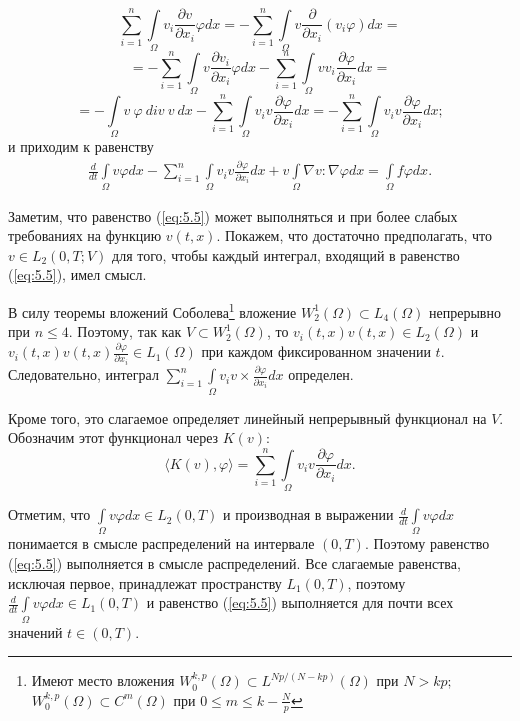 $$\sum_{i=1}^{n}\int\limits_\Omega v_i\frac{\partial v}{\partial x_i}\varphi dx=-\sum_{i=1}^{n}\int\limits_\Omega v\frac{\partial}{\partial x_i}(v_i\varphi)dx=$$
$$=-\sum_{i=1}^{n}\int\limits_\Omega v\frac{\partial v_i}{\partial x_i}\varphi dx-\sum_{i=1}^{n}\int\limits_\Omega vv_i\frac{\partial\varphi}{\partial x_i} dx=$$
$$=-\int\limits_\Omega v \ \varphi \ div \ v \ dx-\sum_{i=1}^{n}\int\limits_\Omega v_i v\frac{\partial\varphi}{\partial x_i}dx=
-\sum_{i=1}^{n}\int\limits_\Omega v_i v\frac{\partial\varphi}{\partial x_i}dx;$$
и приходим к равенству
\begin{equation}\label{eq:5.5}
    \begin{gathered}
        \frac{d}{dt}\int\limits_\Omega v \varphi dx-\sum_{i=1}^{n}\int\limits_\Omega v_i v
        \frac{\partial \varphi }{\partial x_i}dx + v\int\limits_\Omega \nabla v :\nabla\varphi dx
        =\int\limits_\Omega f\varphi dx.
    \end{gathered}
\end{equation}

Заметим, что равенство (\ref{eq:5.5}) может выполняться и при более слабых требованиях на функцию $v(t, x)$.
Покажем, что достаточно предполагать, что $v\in L_2(0, T;V)$ для того, чтобы каждый интеграл, входящий в равенство (\ref{eq:5.5}), имел смысл.

В силу теоремы вложений Соболева\footnote{Имеют место вложения $W^{k,p}_0(\Omega)\subset L^{Np/(N-kp)}(\Omega)$ при $N>kp;$\\
$W^{k,p}_0(\Omega)\subset C^{m}(\Omega)$ при $0\le m\le k-\frac{N}{p}$} вложение $W^{1}_{2}(\Omega)\subset L_4(\Omega)$ непрерывно при $n \leqslant 4$.
Поэтому, так как $V\subset W^{1}_{2}(\Omega)$, то $v_i(t, x)v(t, x)\in L_2(\Omega)$ и $v_i(t, x)v(t, x)\frac{\partial \varphi }{\partial x_i} \in L_1(\Omega)$
при каждом фиксированном значении $t$. Следовательно, интеграл $\sum\limits_{i=1}^{n}\int\limits_\Omega v_iv\times\frac{\partial\varphi}{\partial x_i}dx$ определен.

Кроме того, это слагаемое определяет линейный непрерывный функционал на $V$. Обозначим этот функционал через $K(v)$:
$$\langle K(v),\varphi \rangle = \sum_{i=1}^{n}\int\limits_\Omega v_i v \frac{\partial \varphi}{\partial x_i}dx.$$

Отметим, что $\int\limits_\Omega v \varphi dx\in L_2(0, T)$ и производная в выражении \linebreak
$\frac{d}{dt}\int\limits_\Omega v \varphi dx$
понимается в смысле распределений на интервале $(0, T)$. Поэтому равенство (\ref{eq:5.5}) выполняется в смысле распределений.
Все слагаемые равенства, исключая первое, принадлежат пространству $L_1(0, T)$, поэтому $\frac{d}{dt}\int\limits_\Omega v \varphi dx\in L_1(0, T)$
и равенство (\ref{eq:5.5}) выполняется для почти всех значений $t\in (0, T)$.

